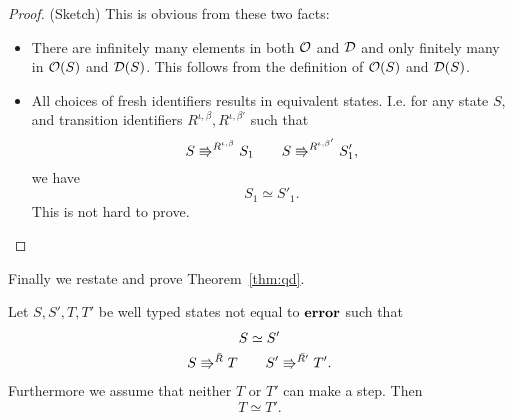 \begin{proof}{(Sketch)}
  This is obvious from these two facts:
  \begin{itemize}
    \item There are infinitely many elements in both $\mathcal{O}$ and $\mathcal{D}$ and
      only finitely many in $\mathcal{O}(S)$ and $\mathcal{D}(S)$. This follows from
      the definition of $\mathcal{O}(S)$ and $\mathcal{D}(S)$.
    \item All choices of fresh identifiers results in equivalent states. I.e.
      for any state $S$, and transition identifiers $R^{\iota, \beta},
      R^{\iota, \beta'}$ such that 
      \begin{equation*}
        S \Rrightarrow^{R^{\iota, \beta}} S_1 \quad\quad S
        \Rrightarrow^{R^{\iota, \beta'}} S'_1,
      \end{equation*}
      we have
      \begin{equation*}
        S_1 \simeq S'_1.
      \end{equation*}
      This is not hard to prove.
  \end{itemize}
\end{proof}

Finally we restate and prove Theorem~\ref{thm:qd}.
\begin{theorem*}
  Let $S, S', T, T'$ be well typed states not equal to $\mbox{{\bf error}}$ such that
  \begin{equation*}
    \begin{gathered}
      S \simeq S' \\
      S \Rrightarrow^{\bar{R}} T \quad\quad S' \Rrightarrow^{\bar{R'}} T'.
    \end{gathered}
  \end{equation*}
  Furthermore we assume that neither $T$ or $T'$ can make a step.
  Then
  \begin{equation*}
    T \simeq T'.
  \end{equation*}
\end{theorem*}

